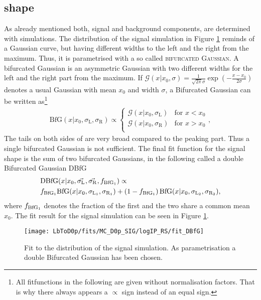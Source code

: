 \subsection{\logIP shape}
As already mentioned both, \logIP signal and background components, are determined with simulations.
The \logIP distribution of the signal simulation in Figure \ref{fig:fit_logIP_signal} reminds of a Gaussian curve, but having different widths to the left and the right from the maximum.
Thus, it is parametrised with a so called \textsc{bifurcated Gaussian}.
A bifurcated Gaussian is an asymmetric Gaussian with two different widths for the left and the right part from the maximum.
If $\mathcal{G}(x|x_0,\sigma) = \frac{1}{\sqrt{2\pi}\sigma}\exp\left(-\frac{x-x_0}{2\sigma}\right)$ denotes a usual Gaussian with mean $x_0$ and width $\sigma$, a Bifurcated Gaussian can be written as\footnote{All fitfunctions in the following are given without normalisation factors. That is why there always appears a $\propto$ sign instead of an equal sign.}
\begin{align}
    \text{BfG}(x|x_0, \sigma_{\text{L}}, \sigma_{\text{R}}) \propto 
    \begin{cases}
        \mathcal{G}(x|x_0,\sigma_{\text{L}}) & \text{for } x < x_0 \\   
        \mathcal{G}(x|x_0,\sigma_{\text{R}}) & \text{for } x > x_0 \\   
    \end{cases},
\end{align}
The tails on both sides of \logIP are very broad compared to the peaking part.
Thus a single bifurcated Gaussian is not sufficient.
The final fit function for the signal \logIP shape is the sum of two bifurcated Gaussians, in the following called a double Bifurcated Gaussian DBfG
\begin{align}
    &\text{DBfG}(x|x_0,\vec{\sigma_{\text{L}_{}}}, \vec{\sigma_{\text{R}_{}}}, f_{\text{BfG}_1}) \propto \nonumber \\
    &f_{\text{BfG}_1} \text{BfG}(x|x_0,\sigma_{\text{L}_{1}}, \sigma_{\text{R}_{1}}) + \left(1 - f_{\text{BfG}_1} \right) \text{BfG}(x|x_0,\sigma_{\text{L}_{2}}, \sigma_{\text{R}_{2}}),
\end{align}
where $f_{\text{BfG}_1}$ denotes the fraction of the first \BfG and the two \BfG share a common mean $x_0$. 
The fit result for the signal simulation can be seen in Figure \ref{fig:fit_logIP_signal}.
\begin{figure}[ptb]
    \centering
	\texttt{[image: LbToD0p/fits/MC\_D0p\_SIG/logIP\_RS/fit\_DBfG]}
	\caption{Fit to the \logIP distribution of the signal simulation. As parametrisation a double Bifurcated Gaussian has been chosen.}
    \label{fig:fit_logIP_signal}
\end{figure}
